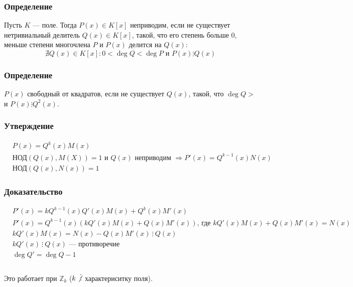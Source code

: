 \documentclass[12pt]{article}
\renewcommand{\gcd}{\text{НОД}}
\begin{document}
        \subsubsection{Определение}
        Пусть $K$ — поле. Тогда $P(x) \in K[x]$ неприводим, если не существует нетривиальный делитель $Q(x) \in K[x]$, такой, что его степень больше 0, меньше степени многочлена $P$ и $P(x)$ делится на $Q(x)$:
\[
    \nexists Q(x) \in K[x] : 0 < \deg Q < \deg P \text{ и } P(x) \vdots Q(x)
\]
\subsubsection{Определение}
$P(x)$ свободный от квадратов, если не существует $Q(x)$, такой, что $\deg Q >$ и $P(x) \vdots Q^2(x)$.
\subsubsection{Утверждение}
$
    \begin{aligned}
         & P(x) = Q^k(x)M(x)                                                                             \\
         & \gcd(Q(x), M(X)) = 1 \text{ и } Q(x) \text{ неприводим } \Rightarrow P'(x) = Q^{k - 1}(x)N(x) \\
         & \gcd(Q(x), N(x)) = 1
    \end{aligned}
$
\subsubsection{Доказательство}
$
    \begin{aligned}
         & P'(x) = kQ^{k - 1}(x)Q'(x)M(x) + Q^k(x)M'(x)                                             \\
         & P'(x) = Q^{k - 1}(x)(kQ'(x)M(x) + Q(x)M'(x)) \text{, где } kQ'(x)M(x) + Q(x)M'(x) = N(x) \\
         & kQ'(x)M(x) = N(x) - Q(x)M'(x)\ \vdots\ Q(x)                                              \\
         & kQ'(x) \ \vdots\ Q(x) \text{ — противоречие}                                             \\
         & \deg Q' = \deg Q - 1                                                                     \\
    \end{aligned}
$

Это работает при $\mathbb{Z}_k$ ($k \not \vdots$  характериситку поля).
\end{document}
